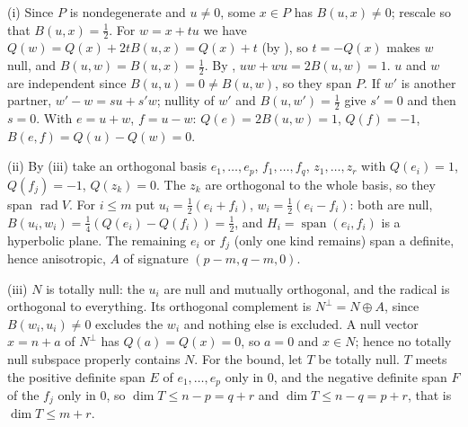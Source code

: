 (i) Since $P$ is nondegenerate and $u \ne 0$, some $x \in P$ has $B(u, x) \ne 0$; rescale so that $B(u, x) = \tfrac12$. For $w = x + t u$ we have $Q(w) = Q(x) + 2t B(u, x) = Q(x) + t$ (by ), so $t = -Q(x)$ makes $w$ null, and $B(u, w) = B(u, x) = \tfrac12$. By , $uw + wu = 2B(u, w) = 1$. $u$ and $w$ are independent since $B(u, u) = 0 \ne B(u, w)$, so they span $P$. If $w'$ is another partner, $w' - w = s u + s' w$; nullity of $w'$ and $B(u, w') = \tfrac12$ give $s' = 0$ and then $s = 0$. With $e = u + w$, $f = u - w$: $Q(e) = 2B(u, w) = 1$, $Q(f) = -1$, $B(e, f) = Q(u) - Q(w) = 0$.

(ii) By (iii) take an orthogonal basis $e_1, \dots, e_p$, $f_1, \dots, f_q$, $z_1, \dots, z_r$ with $Q(e_i) = 1$, $Q(f_j) = -1$, $Q(z_k) = 0$. The $z_k$ are orthogonal to the whole basis, so they span $\operatorname{rad} V$. For $i \le m$ put $u_i = \tfrac12(e_i + f_i)$, $w_i = \tfrac12(e_i - f_i)$: both are null, $B(u_i, w_i) = \tfrac14(Q(e_i) - Q(f_i)) = \tfrac12$, and $H_i = \operatorname{span}(e_i, f_i)$ is a hyperbolic plane. The remaining $e_i$ or $f_j$ (only one kind remains) span a definite, hence anisotropic, $A$ of signature $(p - m, q - m, 0)$.

(iii) $N$ is totally null: the $u_i$ are null and mutually orthogonal, and the radical is orthogonal to everything. Its orthogonal complement is $N^{\perp} = N \oplus A$, since $B(w_i, u_i) \ne 0$ excludes the $w_i$ and nothing else is excluded. A null vector $x = n + a$ of $N^{\perp}$ has $Q(a) = Q(x) = 0$, so $a = 0$ and $x \in N$; hence no totally null subspace properly contains $N$. For the bound, let $T$ be totally null. $T$ meets the positive definite span $E$ of $e_1, \dots, e_p$ only in $0$, and the negative definite span $F$ of the $f_j$ only in $0$, so $\dim T \le n - p = q + r$ and $\dim T \le n - q = p + r$, that is $\dim T \le m + r$.
